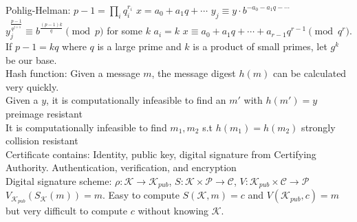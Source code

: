 \documentclass[10pt]{article}
\begin{document}
Pohlig-Helman\@: $p-1=\prod_{i}q_i^{r_i}$ $x=a_0+a_1 q+\cdots$ $y_j\equiv y\cdot b^{-a_0-a_1q-\cdots}$ $y_j^{\frac{p-1}{q^{j+1}}}\equiv b^{\frac{(p-1)k}{q}}\pmod{p}$ for some $k$ $a_i=k$ $x\equiv a_0+a_1 q+\cdots+a_{r-1}q^{r-1}\pmod{q^r}$. If $p-1=kq$ where $q$ is a large prime and $k$ is a product of small primes, let $g^k$ be our base.\\

Hash function: Given a message $m$, the message digest $h(m)$ can be calculated very quickly.\\
Given a $y$, it is computationally infeasible to find an $m'$ with $h(m')=y$ preimage resistant\\
It is computationally infeasible to find $m_1,m_2$ s.t $h(m_1)=h(m_2)$ strongly collision resistant\\

Certificate contains: Identity, public key, digital signature from Certifying Authority. Authentication, verification, and encryption\\

Digital signature scheme\@: $\rho: \mathcal{K}\rightarrow\mathcal{K}_{pub}$, $S:\mathcal{K}\times\mathcal{P}\rightarrow\mathcal{C}$, $V:\mathcal{K}_{pub}\times \mathcal{C}\rightarrow \mathcal{P}$ $V_{\mathcal{K}_{pub}}(S_{\mathcal{K}}(m))=m$. Easy to compute $S(\mathcal{K},m)=c$ and $V(\mathcal{K}_{pub},c)=m$ but very difficult to compute $c$ without knowing $\mathcal{K}$.
\end{document}
